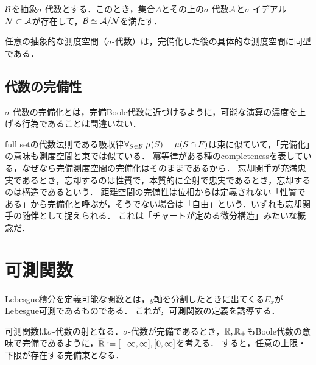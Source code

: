 \documentclass[uplatex, dvipdfmx]{jsreport}
\begin{document}
\begin{theorem}
    $\mathcal{B}$を抽象$\sigma$-代数とする．このとき，集合$A$とその上の$\sigma$-代数$\mathcal{A}$と$\sigma$-イデアル$\mathcal{N}\subset\mathcal{A}$が存在して，$\mathcal{B}\simeq\mathcal{A}/\mathcal{N}$を満たす．
\end{theorem}

\begin{corollary}
    任意の抽象的な測度空間（$\sigma$-代数）は，完備化した後の具体的な測度空間に同型である．
\end{corollary}

\subsection{代数の完備性}

\begin{tcolorbox}[colframe=ForestGreen, colback=ForestGreen!10!white,breakable,colbacktitle=ForestGreen!40!white,coltitle=black,fonttitle=\bfseries\sffamily,
title=]
    $\sigma$-代数の完備化とは，完備Boole代数に近づけるように，可能な演算の濃度を上げる行為であることは間違いない．
\end{tcolorbox}

full setの代数法則である吸収律$\forall_{S\in\mathcal{B}}\;\mu(S)=\mu(S\cap F)$は束に似ていて，「完備化」の意味も測度空間と束では似ている．
冪等律がある種のcompletenessを表している，なぜなら完備測度空間の完備化はそのままであるから．
忘却関手が充満忠実であるとき，忘却するのは性質で，本質的に全射で忠実であるとき，忘却するのは構造であるという．
距離空間の完備性は位相からは定義されない「性質である」から完備化と呼ぶが，そうでない場合は「自由」という．いずれも忘却関手の随伴として捉えられる．
これは「チャートが定める微分構造」みたいな概念だ．

\section{可測関数}

\begin{tcolorbox}[colframe=ForestGreen, colback=ForestGreen!10!white,breakable,colbacktitle=ForestGreen!40!white,coltitle=black,fonttitle=\bfseries\sffamily,
title=]
    Lebesgue積分を定義可能な関数とは，$y$軸を分割したときに出てくる$E_x$がLebesgue可測であるものである．
    これが，可測関数の定義を誘導する．

    可測関数は$\sigma$-代数の射となる．$\sigma$-代数が完備であるとき，$\mathbb{R},\mathbb{R}_+$もBoole代数の意味で完備であるように，$\overline{\mathbb{R}}:=[-\infty,\infty],[0,\infty]$を考える．
    すると，任意の上限・下限が存在する完備束となる．
\end{tcolorbox}
\end{document}
